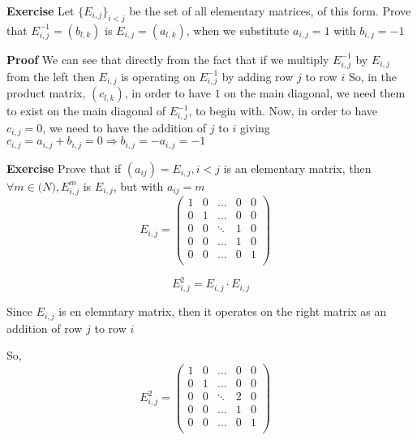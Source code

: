 \documentclass[12pt]{article}
\begin{document}
\textbf{Exercise}
Let \( \{ E_{i,j} \}_{i<j} \) be the set of all elementary matrices, of this form. \newline
Prove that \( E_{i,j}^{-1}=(b_{l,k}) \) is \( E_{i,j}=(a_{l,k}) \), when we substitute \( a_{i,j}=1 \) with \( b_{i,j}=-1 \) \newline

\textbf{Proof}
We can see that directly from the fact that if we multiply \( E_{i,j}^{-1} \) by \( E_{i,j} \) from the left 
then \( E_{i,j} \) is operating on \( E_{i,j}^{-1} \) by adding row \( j \) to row \(i \) \newline
So, in the product matrix, \( (c_{l,k}) \), in order to have \( 1 \) \newline 
on the main diagonal, we need them to exist on the main diagonal
of \( E_{i,j}^{-1} \), to begin with. Now, in order to have \( c_{i,j}=0 \), we need to have the addition of \( j \) to \( i \)
giving \( c_{i,j}=a_{i,j}+b_{i,j}=0 \Rightarrow b_{i,j}=-a_{i,j}=-1 \) \newline

\textbf{Exercise} Prove that if \( (a_{ij})=E_{i,j}, i<j \) is an elementary matrix, \newline
then \( \forall m \in \mathbb(N), E_{i,j}^m \) is \(E_{i,j} \), but with \( a_{ij}=m \) \newline
$$
	E_{i,j} = \begin{pmatrix} 
	1 & 0 & \dots & 0 & 0 \\
	0 & 1 & \dots & 0 & 0 \\
	0 & 0 & \ddots & 1 & 0 \\
	0 & 0 & \dots & 1 & 0 \\
	0 & 0 & \dots & 0 & 1 \\
	\end{pmatrix}
	\quad
	$$

$$ E_{i,j}^2=E_{i,j} \cdot E_{i,j} $$

Since \( E_{i,j} \) is en elemntary matrix, then it operates on the right matrix
as an addition of row \( j \) to row \( i \) \newline

So, $$
	E_{i,j}^2 = \begin{pmatrix} 
	1 & 0 & \dots & 0 & 0 \\
	0 & 1 & \dots & 0 & 0 \\
	0 & 0 & \ddots & 2 & 0 \\
	0 & 0 & \dots & 1 & 0 \\
	0 & 0 & \dots & 0 & 1 \\
	\end{pmatrix}
	\quad
	$$
\end{document}
